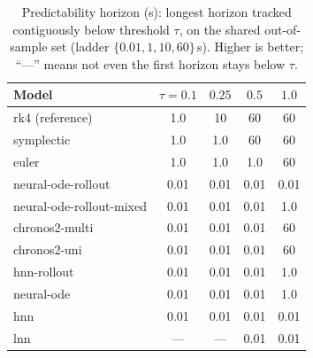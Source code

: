 \documentclass{article}
\begin{document}
\begin{table}[tbp]
\centering\small
\caption{Predictability horizon (s): longest horizon tracked contiguously below threshold
$\tau$, on the shared out-of-sample set (ladder $\{0.01,1,10,60\}$\,s). Higher is better;
``---'' means not even the first horizon stays below $\tau$.}\label{tab:predhorizon}
\begin{tabular}{lcccc}
\toprule
Model & $\tau{=}0.1$ & $0.25$ & $0.5$ & $1.0$ \\
\midrule
rk4 (reference) & 1.0 & 10 & 60 & 60 \\
symplectic & 1.0 & 1.0 & 60 & 60 \\
euler & 1.0 & 1.0 & 1.0 & 60 \\
neural-ode-rollout & 0.01 & 0.01 & 0.01 & 0.01 \\
neural-ode-rollout-mixed & 0.01 & 0.01 & 0.01 & 1.0 \\
chronos2-multi & 0.01 & 0.01 & 0.01 & 60 \\
chronos2-uni & 0.01 & 0.01 & 0.01 & 60 \\
hnn-rollout & 0.01 & 0.01 & 0.01 & 1.0 \\
neural-ode & 0.01 & 0.01 & 0.01 & 1.0 \\
hnn & 0.01 & 0.01 & 0.01 & 0.01 \\
lnn & --- & --- & 0.01 & 0.01 \\
\bottomrule
\end{tabular}
\end{table}
\end{document}
